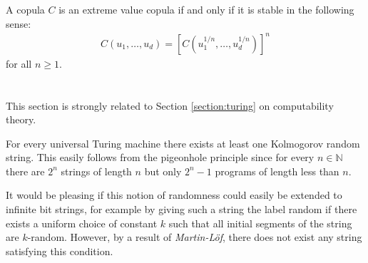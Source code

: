     \begin{property}
        A copula $C$ is an extreme value copula if and only if it is stable in the following sense:
        \begin{gather}
            C(u_1,\ldots,u_d) = \left[C(u_1^{1/n},\ldots,u_d^{1/n})\right]^n
        \end{gather}
        for all $n\geq1$.
    \end{property}

\section{}

    This section is strongly related to Section \ref{section:turing} on computability theory.


    \begin{property}
        For every universal Turing machine there exists at least one Kolmogorov random string. This easily follows from the pigeonhole principle since for every $n\in\mathbb{N}$ there are $2^n$ strings of length $n$ but only $2^n-1$ programs of length less than $n$.
    \end{property}

    It would be pleasing if this notion of randomness could easily be extended to infinite bit strings, for example by giving such a string the label random if there exists a uniform choice of constant $k$ such that all initial segments of the string are $k$-random. However, by a result of \textit{Martin-L\"of}, there does not exist any string satisfying this condition.